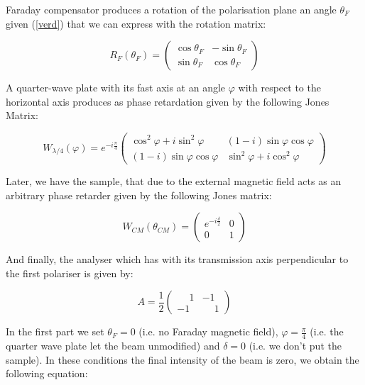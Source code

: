 \documentclass[11pt,a4paper]{article}
\begin{document}
Faraday compensator produces a rotation of the polarisation plane an angle $\theta_F$ given (\ref{verd}) that we can express with the rotation matrix:

\begin{equation}\label{eq:rotation_matrix}
R_F(\theta_F)=
\begin{pmatrix}
\cos\theta_F & -\sin\theta_F \\
\sin\theta_F & \cos\theta_F
\end{pmatrix}
\end{equation}

A quarter-wave plate with its fast axis at an angle $\varphi$ with respect to the horizontal axis produces as phase retardation given by the following Jones Matrix:

\begin{equation}\label{eq:quarter_wave}
W_{\lambda/4}(\varphi)=e^{-i\frac{\pi}{4}}
\begin{pmatrix}
\cos^2\varphi+i\sin^2\varphi & (1-i)\sin\varphi\cos\varphi \\
(1-i)\sin\varphi\cos\varphi & \sin^2\varphi+i\cos^2\varphi
\end{pmatrix}
\end{equation}

Later, we have the sample, that due to the external magnetic field acts as an arbitrary phase retarder given by the following Jones matrix:

\begin{equation}\label{eq:birefringent}
W_{CM}(\theta_{CM})=
\begin{pmatrix}
e^{-i\frac{\delta}{2}} & 0 \\
0 & 1
\end{pmatrix}
\end{equation}

And finally, the analyser which has with its transmission axis perpendicular to the first polariser is given by:

\begin{equation}\label{eq:analyser}
A=\frac{1}{2}
\begin{pmatrix}
\phantom{-}1 & -1 \\
-1 & \phantom{-}1
\end{pmatrix}
\end{equation}

In the first part we set $\theta_F=0$ (i.e. no Faraday magnetic field), $\varphi=\frac{\pi}{4}$ (i.e. the quarter wave plate let the beam unmodified) and $\delta=0$ (i.e. we don't put the sample). In these conditions the final intensity of the beam is zero, we obtain the following equation:
\end{document}
